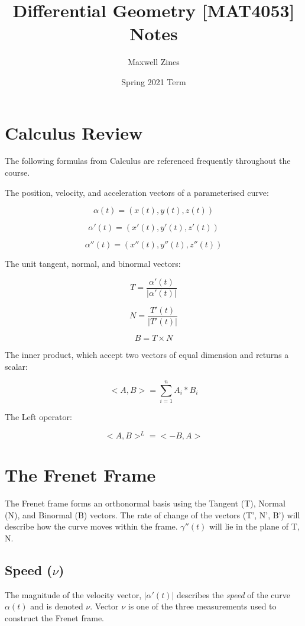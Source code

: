 \documentclass{article}
\title{Differential Geometry [MAT4053] Notes}
\author{Maxwell Zines}
\date{Spring 2021 Term}
\begin{document}
\maketitle

\tableofcontents

\section{Calculus Review}

The following formulas from Calculus are referenced frequently throughout the course.

The position, velocity, and acceleration vectors of a parameterised curve:

\[\alpha(t) = (x(t), y(t), z(t)) \]

\[\alpha'(t) = (x'(t), y'(t), z'(t)) \]

\[\alpha''(t) = (x''(t), y''(t), z''(t)) \]

The unit tangent, normal, and binormal vectors:

\[T = \frac{\alpha'(t)}{|\alpha'(t)|}\]

\[N = \frac{T'(t)}{|T'(t)|}\]

\[B = T \times N \]

The inner product, which accept two vectors of equal dimension and returns a scalar:

\[ <A,B> = \sum_{i = 1}^{n} A_{i}*B_{i}\]

The Left operator:

\[ <A,B>^L = <-B, A>\]

\section{The Frenet Frame}

The Frenet frame forms an orthonormal basis using the Tangent (T), Normal (N), and Binormal (B) vectors. The rate of change of the vectors (T', N', B') will describe how the curve moves within the frame. $\gamma''(t)$ will lie in the plane of T, N.

\subsection{Speed ($\nu$)}

 The magnitude of the velocity vector, $|\alpha'(t)|$ describes the {\it{speed}} of the curve $\alpha(t)$ and is denoted $\nu$. Vector $\nu$ is one of the three measurements used to construct the Frenet frame.
 
\end{document}
